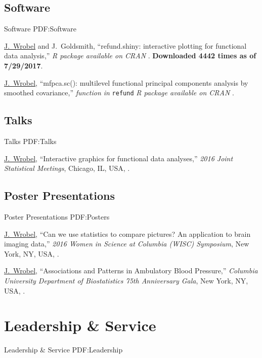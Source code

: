 \documentclass[a4paper,10pt,oneside]{article}
\begin{document}
\begin{body}
\EntryGap
\subsection
{Software}
{Software}
{PDF:Software}

\EntryGap
{}
{\underline{J.~Wrobel} and J.~Goldsmith,
``refund.shiny: interactive plotting for functional data analysis,''
\textit{R package available on CRAN}
. \textbf{Downloaded 4442 times as of 7/29/2017}.}


\EntryGap
{}
{\underline{J.~Wrobel},
``mfpca.sc(): multilevel functional principal components analysis by smoothed covariance,''
\textit{function in} \texttt{refund} \textit{R package available on CRAN}
.}

\EntryGap
\subsection
{Talks}
{Talks}
{PDF:Talks}

\EntryGap

{\underline{J.~Wrobel},
``Interactive graphics for functional data analyses,''
 \textit{2016 Joint Statistical Meetings},
Chicago, IL, USA,
.}

\EntryGap
\subsection
{Poster Presentations}
{Poster Presentations}
{PDF:Posters}

\EntryGap

{\underline{J.~Wrobel},
``Can we use statistics to compare pictures? An application to brain imaging data,''
\textit{2016 Women in Science at Columbia (WISC) Symposium},
New York, NY, USA,
.}

{\underline{J.~Wrobel},
``Associations and Patterns in Ambulatory Blood Pressure,''
 \textit{Columbia University Department of Biostatistics 75th Anniversary Gala},
New York, NY, USA,
.}


\section
{Leadership \&\newline
Service}
{Leadership \& Service}
{PDF:Leadership}



\end{body}
\end{document}
